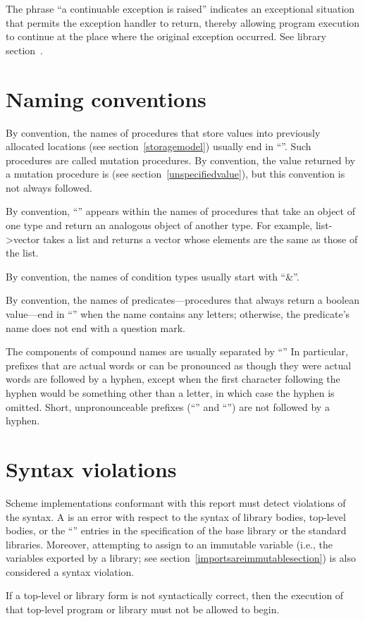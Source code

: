 The phrase ``a continuable exception is raised'' indicates an
exceptional situation that permits the exception handler to return,
thereby allowing program execution to continue at the place where the
original exception occurred.  See library
section~.

\section{Naming conventions}

By convention, the names of procedures that store values into previously
allocated locations (see section~\ref{storagemodel}) usually end in
``\ide{!}''.
Such procedures are called mutation procedures.
By convention, the value returned by a mutation procedure is
\unspecifiedreturn{} (see section~\ref{unspecifiedvalue}),
but this convention is not always followed.

By convention, ``\ide{->}'' appears within the names of procedures that
take an object of one type and return an analogous object of another type.
For example, {\cf list->vector} takes a list and returns a vector whose
elements are the same as those of the list.

By convention, the names of condition types usually start with
``{\cf\&}''.

By convention, the names of predicates---procedures that always return
a boolean value---end in ``'' when the name contains any
letters; otherwise, the predicate's name does not end with a question
mark.

The components of compound names are usually separated by ``\ide{-}''
In particular, prefixes that are actual words or can be pronounced as
though they were actual words are followed by a hyphen, except when
the first character following the hyphen would be something other than
a letter, in which case the hyphen is omitted.  Short,
unpronounceable prefixes (``'' and ``'') are not
followed by a hyphen.

\section{Syntax violations}

Scheme implementations conformant with this report must detect
violations of the syntax.  A  is an error
with respect to the syntax of library bodies, top-level bodies,
or the ``\exprtype'' entries in the
specification of the base library or the standard libraries.
Moreover, attempting to assign to an immutable variable (i.e., the
variables exported by a library; see
section~\ref{importsareimmutablesection}) is also
considered a syntax violation.

If a top-level or library form is not syntactically correct, then the
execution of that top-level program or library must not be allowed to begin.

